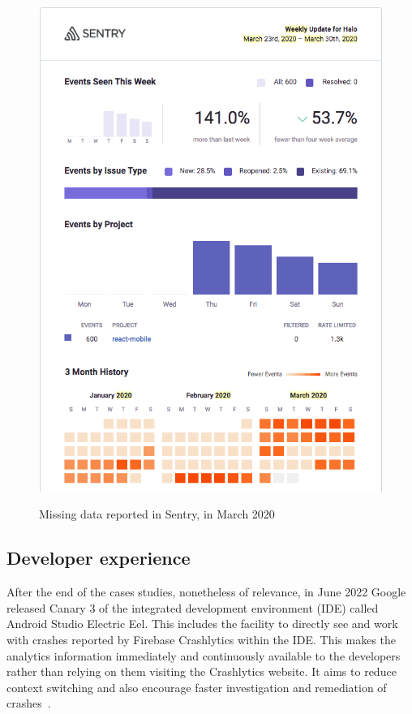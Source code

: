 \begin{figure}[htbp!]
\begin{minipage}{.45\textwidth}
  \includegraphics[width=\textwidth]{images/localhalo/sentry-weekly-report-23-mar-2020.png}
  \label{fig:localhalo-sentry-weekly-report-23-mar-2020}
\end{minipage}
    \caption{Missing data reported in Sentry, in March 2020}
    \label{fig:sentry-missing-data-march-2020}
\end{figure}


\subsection{Developer experience}
After the end of the cases studies, nonetheless of relevance, in June 2022 Google released Canary 3 of the integrated development environment (IDE) called Android Studio Electric Eel. This includes the facility to directly see and work with crashes reported by Firebase Crashlytics within the IDE. This makes the analytics information immediately and continuously available to the developers rather than relying on them visiting the Crashlytics website. It aims to reduce context switching and also encourage faster investigation and remediation of crashes~\citep{android2022_firebase_crash_integration_into_android_studio_electric_eel}.

